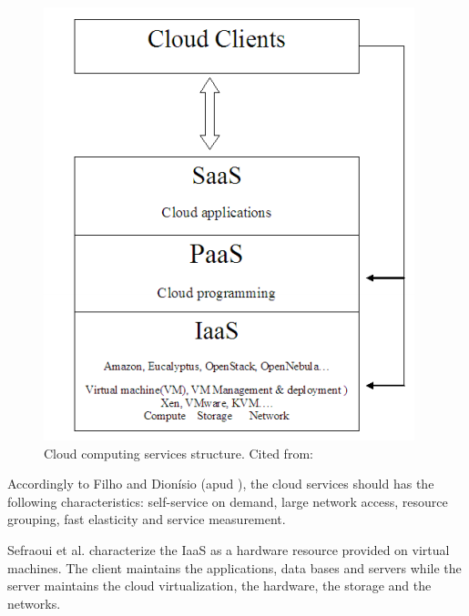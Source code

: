 \documentclass[conference]{IEEEtran}
\begin{document}
\begin{figure}[ht]
\centering
\includegraphics[width=.3\textwidth]{figuras/cloud_structure.png}
\caption{Cloud computing services structure. Cited from: \cite{sefraoui2012openstack}}
\label{fig:cloud_structure}
\end{figure}


Accordingly to Filho and Dionísio \cite{leite2016influencia} (apud \cite{mell2011nist}), the cloud services should has the following 
characteristics: self-service on demand, large network access, resource grouping, fast elasticity and service measurement.


Sefraoui et al. \cite{sefraoui2012openstack} characterize the IaaS as a hardware resource provided on virtual machines. The client
maintains the applications, data bases and servers while the server maintains the cloud virtualization, the hardware, the storage and the networks.   

\end{document}

